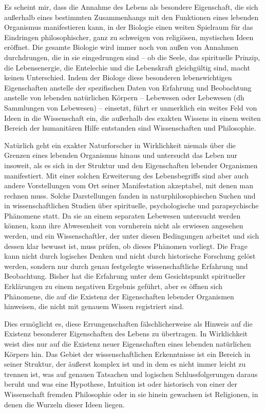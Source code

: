 \documentclass[11pt,a4paper]{book}
\begin{document}
Es scheint mir, dass die Annahme des Lebens als besondere Eigenschaft, die sich außerhalb eines bestimmten Zusammenhangs mit den Funktionen eines lebenden Organismus manifestieren kann, in der Biologie einen weiten Spielraum für das Eindringen philosophischer, ganz zu schweigen von religiösen, mystischen Ideen eröffnet. Die gesamte Biologie wird immer noch von außen von Annahmen durchdrungen, die in sie eingedrungen sind -- ob die Seele, das spirituelle Prinzip, die Lebensenergie, die Entelechie und die Lebenskraft gleichgültig sind, macht keinen Unterschied. Indem der Biologe diese besonderen lebenswichtigen Eigenschaften anstelle der spezifischen Daten von Erfahrung und Beobachtung anstelle von lebenden natürlichen Körpern -- Lebewesen oder Lebewesen (dh Sammlungen von Lebewesen) -- einsetzt, führt er unmerklich ein weites Feld von Ideen in die Wissenschaft ein, die außerhalb des exakten Wissens in einem weiten Bereich der humanitären Hilfe entstanden sind Wissenschaften und Philosophie.



Natürlich geht ein exakter Naturforscher in Wirklichkeit niemals über die Grenzen eines lebenden Organismus hinaus und untersucht das Leben nur insoweit, als es sich in der Struktur und den Eigenschaften lebender Organismen manifestiert. Mit einer solchen Erweiterung des Lebensbegriffs sind aber auch andere Vorstellungen vom Ort seiner Manifestation akzeptabel, mit denen man rechnen muss. Solche Darstellungen fanden in naturphilosophischen Suchen und in wissenschaftlichen Studien über spirituelle, psychologische und parapsychische Phänomene statt. Da sie an einem separaten Lebewesen untersucht werden können, kann ihre Abwesenheit von vornherein nicht als erwiesen angesehen werden, und ein Wissenschaftler, der unter diesen Bedingungen arbeitet und sich dessen klar bewusst ist, muss prüfen, ob dieses Phänomen vorliegt. Die Frage kann nicht durch logisches Denken und nicht durch historische Forschung gelöst werden, sondern nur durch genau festgelegte wissenschaftliche Erfahrung und Beobachtung. Bisher hat die Erfahrung unter dem Gesichtspunkt spiritueller Erklärungen zu einem negativen Ergebnis geführt, aber es öffnen sich Phänomene, die auf die Existenz der Eigenschaften lebender Organismen hinweisen, die nicht mit genauem Wissen registriert sind.



Dies ermöglicht es, diese Errungenschaften fälschlicherweise als Hinweis auf die Existenz besonderer Eigenschaften des Lebens zu übertragen. In Wirklichkeit weist dies nur auf die Existenz neuer Eigenschaften eines lebenden natürlichen Körpers hin. Das Gebiet der wissenschaftlichen Erkenntnisse ist ein Bereich in seiner Struktur, der äußerst komplex ist und in dem es nicht immer leicht zu trennen ist, was auf genauen Tatsachen und logischen Schlussfolgerungen daraus beruht und was eine Hypothese, Intuition ist oder historisch von einer der Wissenschaft fremden Philosophie oder in sie hinein gewachsen ist Religionen, in denen die Wurzeln dieser Ideen liegen.
\end{document}
